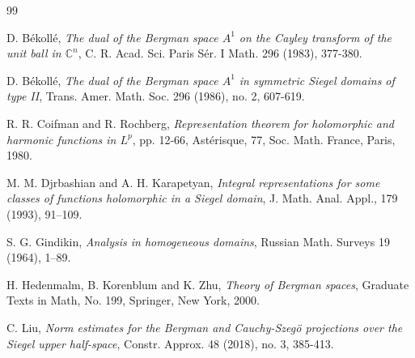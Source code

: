 \documentclass{amsart}
\numberwithin{equation}{section}
\newcommand{\bbC}{\mathbb{C}}
\begin{document}
\begin{thebibliography}{99}

%

D. B\'ekoll\'e,
\textit{The dual of the Bergman space $A^1$ on the Cayley transform of the unit ball in  $\mathbb{C}^n$},
C. R. Acad. Sci. Paris S\'er. I Math. 296 (1983), 377-380.

D. B\'ekoll\'e,
\textit{The dual of the Bergman space $A^1$ in symmetric Siegel domains of type II},
Trans. Amer. Math. Soc. 296 (1986), no. 2, 607-619.


R. R. Coifman and R. Rochberg, \textit{Representation theorem for holomorphic and harmonic
functions in $L^p$}, pp. 12-66, Ast\'{e}risque, 77, Soc. Math. France, Paris, 1980.


M. M. Djrbashian and A. H. Karapetyan, \textit{Integral representations for some classes of functions holomorphic in a Siegel domain}, J. Math. Anal. Appl., 179 (1993), 91--109.



S. G. Gindikin, \textit{Analysis in homogeneous domains}, Russian Math. Surveys 19 (1964), 1--89.


H. Hedenmalm, B. Korenblum and K. Zhu, \textit{Theory of Bergman spaces}, Graduate Texts in Math, No. 199, Springer, New York, 2000.






C. Liu, \textit{Norm estimates for the Bergman and Cauchy-Szeg\"{o} projections over the Siegel upper half-space}, Constr. Approx. 48 (2018), no. 3, 385-413.


\end{thebibliography}
\end{document}
